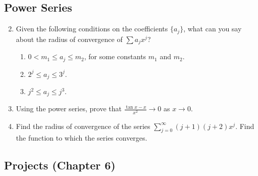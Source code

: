 \documentclass{article}
\begin{document}
\subsection{Power Series}

\begin{enumerate}
      \setcounter{enumi}{1}
      \item Given the following conditions on the coefficients $\{a_j\}$, what
            can you say about the radius of convergence of $\sum a_jx^j$?
            \begin{enumerate}
                  \item $0<m_1\leq a_j\leq m_2$, for some constants $m_1$ and $m_2$.
                  \item $2^j\leq a_j\leq 3^j$.
                  \item $j^2\leq a_j\leq j^3$.
            \end{enumerate}
            \setcounter{enumi}{5}
      \item Using the power series, prove that
            $\frac{\tan x-x}{x^2}\to 0$ as $x\to 0$.
            \setcounter{enumi}{10}
      \item Find the radius of convergence of the series
            $\sum_{j=0}^\infty(j+1)(j+2)x^j$. Find the function to which
            the series converges.
\end{enumerate}

\subsection*{Projects (Chapter 6)}
\end{document}
